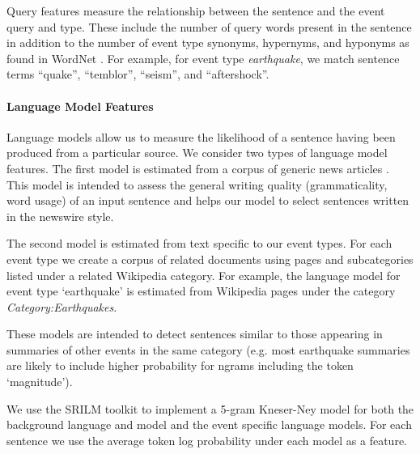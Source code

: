 Query features measure the relationship between the sentence and the event query and type.  These include the number of query words present in the sentence in addition to the number of event type synonyms, hypernyms, and hyponyms as found in WordNet \cite{miller1995wordnet}.  
For example, for event type \emph{earthquake},  we match sentence terms 
``quake'', ``temblor'', ``seism'', and ``aftershock''.

\paragraph{Language Model Features}\label{subsubsec:lm}
Language models allow us to measure the likelihood of a sentence having been 
produced from a particular source.  We consider two types of language model 
features.  The first model is estimated from a corpus of generic news 
articles .  
This model is intended to assess the general writing quality (grammaticality, word usage) of an input sentence and helps our model to select sentences
written in the newswire style.  

The second model is estimated from text specific to our event types.  
For each event type we create a corpus of related documents using pages
and subcategories listed under a related Wikipedia category.
For example, the language model for event type `earthquake' is estimated 
from Wikipedia pages under the category \emph{Category:Earthquakes}.  


These models are intended to detect sentences similar to those appearing in 
summaries of other events in the same category 
(e.g. most earthquake summaries are likely to include higher probability for 
ngrams including the token `magnitude').  

We use the SRILM toolkit to implement a 5-gram Kneser-Ney model for both
the background language and model and the event specific language models.
For each sentence we use the average token log probability under each model
as a feature.




